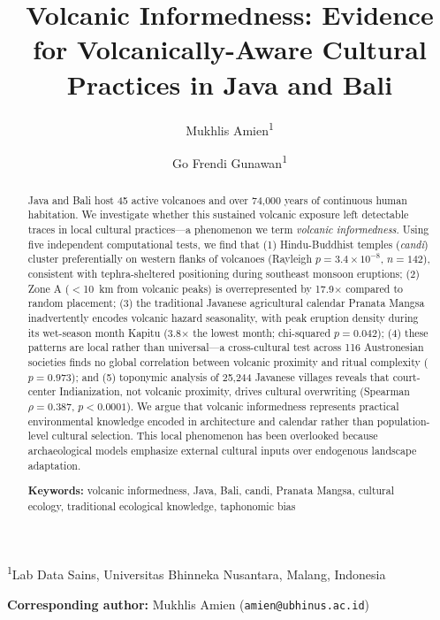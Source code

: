 \documentclass[12pt,a4paper]{article}
\title{Volcanic Informedness: Evidence for Volcanically-Aware Cultural Practices in Java and Bali}
\author{Mukhlis Amien\textsuperscript{1} \and Go Frendi Gunawan\textsuperscript{1}}
\date{}
\begin{document}
\maketitle

\noindent\textsuperscript{1}Lab Data Sains, Universitas Bhinneka Nusantara, Malang, Indonesia

\vspace{1em}
\noindent\textbf{Corresponding author:} Mukhlis Amien (\texttt{amien@ubhinus.ac.id})

\begin{abstract}
Java and Bali host 45 active volcanoes and over 74,000 years of continuous human habitation. We investigate whether this sustained volcanic exposure left detectable traces in local cultural practices---a phenomenon we term \emph{volcanic informedness}. Using five independent computational tests, we find that (1) Hindu-Buddhist temples (\emph{candi}) cluster preferentially on western flanks of volcanoes (Rayleigh $p=3.4\times10^{-8}$, $n=142$), consistent with tephra-sheltered positioning during southeast monsoon eruptions; (2) Zone A ($<$10~km from volcanic peaks) is overrepresented by 17.9$\times$ compared to random placement; (3) the traditional Javanese agricultural calendar Pranata Mangsa inadvertently encodes volcanic hazard seasonality, with peak eruption density during its wet-season month Kapitu (3.8$\times$ the lowest month; chi-squared $p=0.042$); (4) these patterns are local rather than universal---a cross-cultural test across 116 Austronesian societies finds no global correlation between volcanic proximity and ritual complexity ($p=0.973$); and (5) toponymic analysis of 25,244 Javanese villages reveals that court-center Indianization, not volcanic proximity, drives cultural overwriting (Spearman $\rho=0.387$, $p<0.0001$). We argue that volcanic informedness represents practical environmental knowledge encoded in architecture and calendar rather than population-level cultural selection. This local phenomenon has been overlooked because archaeological models emphasize external cultural inputs over endogenous landscape adaptation.

\vspace{0.5em}
\noindent\textbf{Keywords:} volcanic informedness, Java, Bali, candi, Pranata Mangsa, cultural ecology, traditional ecological knowledge, taphonomic bias
\end{abstract}

\newpage

\end{document}
